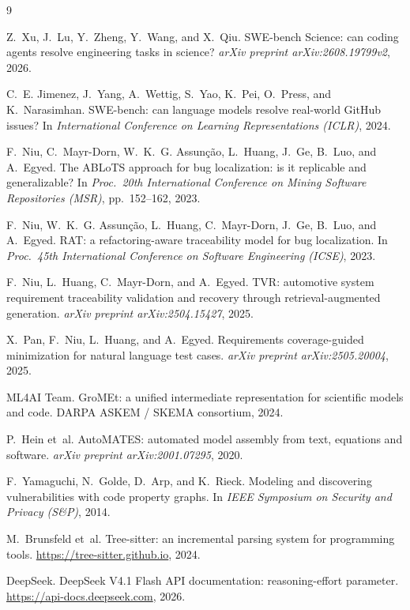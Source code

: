 \documentclass[10pt]{article}
\begin{document}
\begin{samepage}
\begin{thebibliography}{9}

Z.~Xu, J.~Lu, Y.~Zheng, Y.~Wang, and X.~Qiu.
\newblock SWE-bench Science: can coding agents resolve engineering tasks in science?
\newblock \emph{arXiv preprint arXiv:2608.19799v2}, 2026.

C.~E. Jimenez, J.~Yang, A.~Wettig, S.~Yao, K.~Pei, O.~Press, and K.~Narasimhan.
\newblock SWE-bench: can language models resolve real-world GitHub issues?
\newblock In \emph{International Conference on Learning Representations (ICLR)}, 2024.

F.~Niu, C.~Mayr-Dorn, W.~K.~G. Assun{\c{c}}{\~a}o, L.~Huang, J.~Ge, B.~Luo, and A.~Egyed.
\newblock The ABLoTS approach for bug localization: is it replicable and generalizable?
\newblock In \emph{Proc.\ 20th International Conference on Mining Software Repositories (MSR)},
pp.~152--162, 2023.

F.~Niu, W.~K.~G. Assun{\c{c}}{\~a}o, L.~Huang, C.~Mayr-Dorn, J.~Ge, B.~Luo, and A.~Egyed.
\newblock RAT: a refactoring-aware traceability model for bug localization.
\newblock In \emph{Proc.\ 45th International Conference on Software Engineering (ICSE)}, 2023.

F.~Niu, L.~Huang, C.~Mayr-Dorn, and A.~Egyed.
\newblock TVR: automotive system requirement traceability validation and recovery through
retrieval-augmented generation.
\newblock \emph{arXiv preprint arXiv:2504.15427}, 2025.

X.~Pan, F.~Niu, L.~Huang, and A.~Egyed.
\newblock Requirements coverage-guided minimization for natural language test cases.
\newblock \emph{arXiv preprint arXiv:2505.20004}, 2025.

ML4AI Team.
\newblock GroMEt: a unified intermediate representation for scientific models and code.
\newblock DARPA ASKEM / SKEMA consortium, 2024.

P.~Hein et~al.
\newblock AutoMATES: automated model assembly from text, equations and software.
\newblock \emph{arXiv preprint arXiv:2001.07295}, 2020.

F.~Yamaguchi, N.~Golde, D.~Arp, and K.~Rieck.
\newblock Modeling and discovering vulnerabilities with code property graphs.
\newblock In \emph{IEEE Symposium on Security and Privacy (S\&P)}, 2014.

M.~Brunsfeld et~al.
\newblock Tree-sitter: an incremental parsing system for programming tools.
\newblock \url{https://tree-sitter.github.io}, 2024.

DeepSeek.
\newblock DeepSeek V4.1 Flash API documentation: reasoning-effort parameter.
\newblock \url{https://api-docs.deepseek.com}, 2026.

\end{thebibliography}
\end{samepage}
\end{document}

